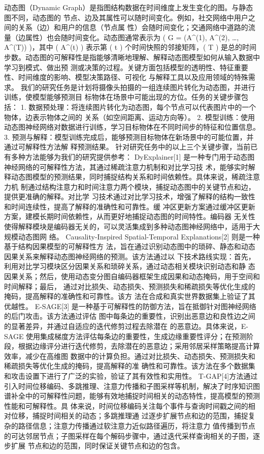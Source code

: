 动态图（Dynamic Graph）是指图结构数据在时间维度上发生变化的图。与静态图不同，动态图的
节点、边及其属性可以随时间变化。例如，社交网络中用户之间的关系（边）和用户的信息（节点属
性）会随时间变化；交通网络中道路的流量（边属性）也会随时间变化。动态图通常表示为 ( G =
(A^{(1)}, A^{(2)}, \ldots, A^{(T)}) )，其中 ( A^{(t)} ) 表示第 ( t ) 个时间快照的邻接矩阵，( T ) 是总的时间
步数。动态图的可解释性是指能够清晰地理解、解释动态图模型如何从输入数据中学习到模式、做出预
测或决策的过程。关键方面包括模型的透明性、特征重要性、时间维度的影响、模型决策路径、可视化
与解释工具以及应用领域的特殊需求。
我们的研究任务是计划将摄像头拍摄的一组连续图片转化为动态图，并进行训练，使模型能够预测目
标物体在场景中可能出现的方位。任务的关键步骤包括：
1. 数据预处理：将连续图片转化为动态图，每个节点可以代表图片中的一个物体，边表示物体之间的
关系（如空间距离、运动方向等）。
2. 模型训练：使用动态图神经网络对数据进行训练，学习目标物体在不同时间步的特征和位置信息。
3. 预测与解释：模型训练完成后，能够预测目标物体在新场景中的可能位置，并通过可解释性方法解
释预测结果。
针对研究任务中的以上三个关键步骤，当前已有多种方法能够为我们的研究提供参考：
DyExplainer[1] 是一种专门用于动态图神经网络的可解释性方法，其通过稀疏注意力机制和对比学习技
术，能够实时解释动态图模型的预测结果，同时捕捉结构关系和时间依赖性。具体来说，稀疏注意力机
制通过结构注意力和时间注意力两个模块，捕捉动态图中的关键节点和边，提供更准确的解释。对比学
习技术通过对比学习技术，增强了解释的结构一致性和时间连续性，提高了解释的准确性和可靠性。缓
冲区更新方案通过缓冲区更新方案，建模长期时间依赖性，从而更好地捕捉动态图的时间特性。编码器
无关性使得解释模块是编码器无关的，可以灵活集成到多种动态图神经网络中，适用于大规模动态图网
络。
Causality-Inspired Spatial-Temporal Explanations[2] 则是一种基于结构因果模型的可解释性方
法，旨在通过识别动态图中的琐碎、静态和动态因果关系来解释动态图神经网络的预测。该方法通过以
下技术路线实现：首先，利用对比学习模块区分因果关系和琐碎关系，通过动态相关模块识别动态和静
态因果关系；然后，使用动态变分图自编码器框架生成因果和动态掩码，用于空间和时间解释；最后，
通过对比损失、动态损失、预测损失和稀疏损失等优化生成的掩码，提高解释的准确性和可靠性。该方
法在合成和真实世界数据集上验证了其优越性。
E-SAGE[3] 是一种基于可解释性的防御方法，旨在抵御针对图神经网络的后门攻击。该方法通过评估
图中每条边的重要性，识别出恶意边和良性边之间的显著差异，并通过自适应的迭代修剪过程去除潜在
的恶意边。具体来说，E-SAGE 使用集成梯度方法评估每条边的重要性，生成边缘重要性评分；在预测阶
段，根据边缘评分进行迭代修剪，去除潜在的恶意边；采用邻居采样策略提高计算效率，减少在高维图
数据中的计算负担。通过对比损失、动态损失、预测损失和稀疏损失等优化生成的掩码，提高解释的准
确性和可靠性。该方法在多个数据集和攻击设置下进行了广泛的实验，验证了其有效性和实用性。
T-GAP[4]方法通过引入时间位移编码、多跳推理、注意力传播和子图采样等机制，解决了时序知识图
谱补全中的可解释性问题，能够有效地捕捉时间相关的动态特性，提高模型的预测性能和可解释性。具
体来说，时间位移编码关注每个事件与查询时间戳之间的相对位移，捕捉时间相关的动态；多跳推理通
过逐步扩展节点和边的范围，捕捉复杂的路径信息；注意力传播通过软注意力近似路径遍历，将注意力
值传播到节点的可达邻居节点；子图采样在每个解码步骤中，通过迭代采样查询相关的子图，逐步扩展
节点和边的范围，同时保证关键节点和边的包含。






